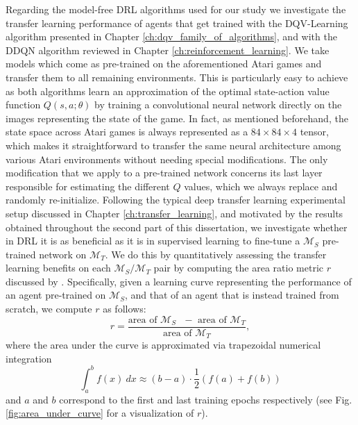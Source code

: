 Regarding the model-free DRL algorithms used for our study we investigate the transfer learning performance of agents that get trained with the DQV-Learning algorithm \cite{sabatelli2018deep} presented in Chapter \ref{ch:dqv_family_of_algorithms}, and with the DDQN algorithm \cite{van2016deep} reviewed in Chapter \ref{ch:reinforcement_learning}. We take models which come as pre-trained on the aforementioned Atari games and transfer them to all remaining environments. This is particularly easy to achieve as both algorithms learn an approximation of the optimal state-action value function $Q(s,a;\theta)$ by training a convolutional neural network directly on the images representing the state of the game. In fact, as mentioned beforehand, the state space across Atari games is always represented as a $84\times84\times4$ tensor, which makes it straightforward to transfer the same neural architecture among various Atari environments without needing special modifications. The only modification that we apply to a pre-trained network concerns its last layer responsible for estimating the different $Q$ values, which we always replace and randomly re-initialize. Following the typical deep transfer learning experimental setup discussed in Chapter \ref{ch:transfer_learning}, and motivated by the results obtained throughout the second part of this dissertation, we investigate whether in DRL it is as beneficial as it is in supervised learning to fine-tune a $\mathcal{M}_S$ pre-trained network on $\mathcal{M}_T$. We do this by quantitatively assessing the transfer learning benefits on each $\mathcal{M}_S/\mathcal{M}_T$ pair by computing the area ratio metric $r$ discussed by \citet{taylor2009transfer}. Specifically, given a learning curve representing the performance of an agent pre-trained on $\mathcal{M}_S$, and that of an agent that is instead trained from scratch, we compute $r$ as follows:
\begin{equation}
	r = \frac{\text{area of $\mathcal{M}_S$ $-$ area of $\mathcal{M}_T$}}{\text{area of $\mathcal{M}_T$}},
\label{eq:area_ratio_metric}
\end{equation}
where the area under the curve is approximated via trapezoidal numerical integration
\begin{equation}
	\int^{b}_{a}f(x)\:dx \approx(b-a) \cdot \frac{1}{2}(f(a)+f(b))
\end{equation}
and $a$ and $b$ correspond to the first and last training epochs respectively (see Fig. \ref{fig:area_under_curve} for a visualization of $r$).

